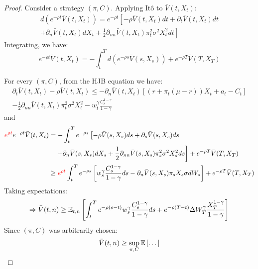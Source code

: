\begin{proof}
Consider a strategy $(\pi, C)$. Applying Itô to $\bar{V}(t, X_t)$:
\begin{multline*}
    d(e^{-\rho t} \bar{V}(t, X_t)) = e^{-\rho t} \left[ -\rho \bar{V}(t, X_t) dt + \partial_t \bar{V}(t, X_t) dt \right. \\
    \left. + \partial_n \bar{V}(t, X_t) dX_t + \frac{1}{2} \partial_{nn} \bar{V}(t, X_t) \pi_t^2 \sigma^2 X_t^2 dt \right]
\end{multline*}
Integrating, we have:
\begin{equation*}
    e^{-\rho t} \bar{V}(t, X_t) = -\int_t^T d(e^{-\rho s} \bar{V}(s, X_s)) + e^{-\rho T} \bar{V}(T, X_T)
\end{equation*}

For every $(\pi, C)$, from the HJB equation we have:
\begin{multline*}
    \partial_t \bar{V}(t, X_t) - \rho \bar{V}(t, X_t) \leq -\partial_n \bar{V}(t, X_t) \left[ (r + \pi_t(\mu - r)) X_t + a_t - C_t \right] \\
    - \frac{1}{2} \partial_{nn} \bar{V}(t, X_t) \pi_t^2 \sigma^2 X_t^2 - w_t^\gamma \frac{C_t^{1-\gamma}}{1-\gamma}
\end{multline*}
and
\begin{align*}
    {\color{red}e^{\rho t}} e^{-\rho t} \bar{V}(t, X_t) &= -\int_t^T e^{-\rho s} \left[ -\rho \bar{V}(s, X_s) ds + \partial_s \bar{V}(s, X_s) ds \right. \\
    &\quad \left. + \partial_n \bar{V}(s, X_s) dX_s + \frac{1}{2} \partial_{nn} \bar{V}(s, X_s) \pi_s^2 \sigma^2 X_s^2 ds \right] + e^{-\rho T} \bar{V}(T, X_T) \\
    &\geq {\color{red}e^{\rho t}} \int_t^T e^{-\rho s} \left[ w_s^\gamma \frac{C_s^{1-\gamma}}{1-\gamma} ds - \partial_n \bar{V}(s, X_s) \pi_s X_s \sigma dW_s \right] + e^{-\rho T} \bar{V}(T, X_T)
\end{align*}
Taking expectations:
\begin{equation*}
    \Rightarrow \bar{V}(t, n) \geq \mathbb E_{t,n} \left[ \int_t^T e^{-\rho(s-t)} w_s^\gamma \frac{C_s^{1-\gamma}}{1-\gamma} ds + e^{-\rho(T-t)} \Delta W_T^\gamma \frac{X_T^{1-\gamma}}{1-\gamma} \right]
\end{equation*}
Since $(\pi, C)$ was arbitrarily chosen:
\begin{equation*}
    \bar{V}(t, n) \geq \sup_{\pi, C} \mathbb E \left[ \dots \right]
\end{equation*}


\end{proof}
